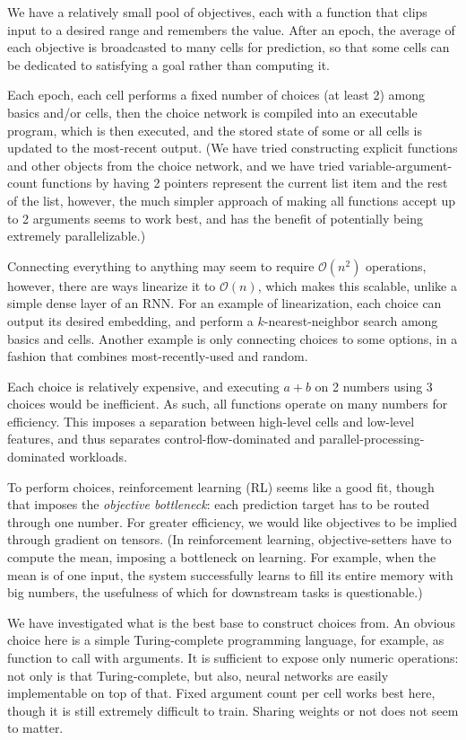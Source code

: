 \documentclass{article}
\begin{document}
We have a relatively small pool of objectives, each with a function that clips input to a desired range and remembers the value. After an epoch, the average of each objective is broadcasted to many cells for prediction, so that some cells can be dedicated to satisfying a goal rather than computing it.

Each epoch, each cell performs a fixed number of choices (at least 2) among basics and/or cells, then the choice network is compiled into an executable program, which is then executed, and the stored state of some or all cells is updated to the most-recent output. (We have tried constructing explicit functions and other objects from the choice network, and we have tried variable-argument-count functions by having 2 pointers represent the current list item and the rest of the list, however, the much simpler approach of making all functions accept up to 2 arguments seems to work best, and has the benefit of potentially being extremely parallelizable.)

Connecting everything to anything may seem to require $\mathcal{O}(n^2)$ operations, however, there are ways linearize it to $\mathcal{O}(n)$, which makes this scalable, unlike a simple dense layer of an RNN. For an example of linearization, each choice can output its desired embedding, and perform a $k$-nearest-neighbor search among basics and cells. Another example is only connecting choices to some options, in a fashion that combines most-recently-used and random.

Each choice is relatively expensive, and executing $a+b$ on 2 numbers using 3 choices would be inefficient. As such, all functions operate on many numbers for efficiency. This imposes a separation between high-level cells and low-level features, and thus separates control-flow-dominated and parallel-processing-dominated workloads.

To perform choices, reinforcement learning (RL) seems like a good fit, though that imposes the \textit{objective bottleneck}: each prediction target has to be routed through one number. For greater efficiency, we would like objectives to be implied through gradient on tensors. (In reinforcement learning, objective-setters have to compute the mean, imposing a bottleneck on learning. For example, when the mean is of one input, the system successfully learns to fill its entire memory with big numbers, the usefulness of which for downstream tasks is questionable.)

We have investigated what is the best base to construct choices from. An obvious choice here is a simple Turing-complete programming language, for example, as function to call with arguments. It is sufficient to expose only numeric operations: not only is that Turing-complete, but also, neural networks are easily implementable on top of that. Fixed argument count per cell works best here, though it is still extremely difficult to train. Sharing weights or not does not seem to matter.
\end{document}
